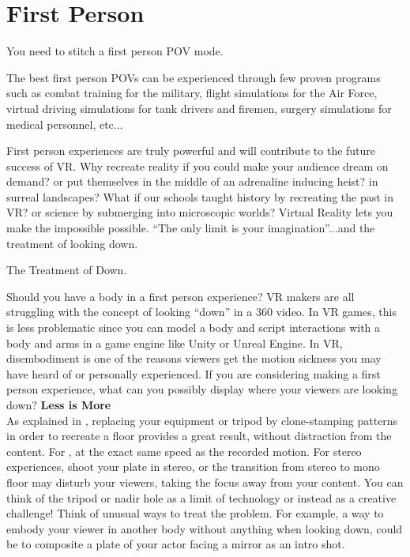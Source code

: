 \section{First Person}
\pagecolor{white}
\label{chap:44}
\begin{fullwidth}

\problem

{\large You need to stitch a first person POV mode. \par}

The best first person POVs can be experienced through few proven programs such as combat training for the military, flight simulations for the Air Force, virtual driving simulations for tank drivers and firemen, surgery simulations for medical personnel, etc... 

First person experiences are truly powerful and will contribute to the future success of VR. Why recreate reality if you could make your audience dream on demand? or put themselves in the middle of an adrenaline inducing heist? in surreal landscapes? What if our schools taught history by recreating the past in VR? or science by submerging into microscopic worlds? Virtual Reality lets you make the impossible possible. “The only limit is your imagination”...and the treatment of looking down.

\solution

{\large The Treatment of Down. \par}

Should you have a body in a first person experience? VR makers are all struggling with the concept of looking “down” in a 360 video. In VR games, this is less problematic since you can model a body and script interactions with a body and arms in a game engine like Unity or Unreal Engine. In VR, disembodiment is one of the reasons viewers get the motion sickness you may have heard of or personally experienced. If you are considering making a first person experience, what can you possibly display where your viewers are looking down? 
\clearpage
{\bfseries Less is More}
\\
As explained in \textbf{}, replacing your equipment or tripod by clone-stamping patterns in order to recreate a floor provides a great result, without distraction from the content. For \textbf{}, \textbf{} at the exact same speed as the recorded motion. For stereo experiences, shoot your plate in stereo, or the transition from stereo to mono floor may disturb your viewers, taking the focus away from your content. You can think of the tripod or nadir hole as a limit of technology or instead as a creative challenge! Think of unusual ways to treat the problem. For example, a way to embody your viewer in another body without anything when looking down, could be to composite a plate of your actor facing a mirror as an intro shot.


\end{fullwidth}
